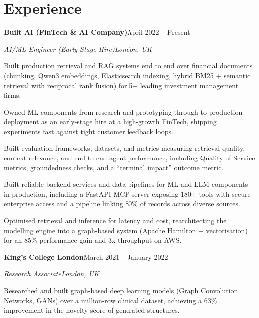 \documentclass[10pt,a4paper]{article}
\newcommand{\entry}[4]{%
  {\color{company}\bfseries #1}\hfill {\color{muted}#2}\par
  \vspace{1pt}
  {\itshape #3}\hfill {\color{muted}\itshape #4}\par
  \vspace{3pt}%
}
\begin{document}
\section{Experience}
\entry{Built AI (FinTech \& AI Company)}{April 2022 -- Present}{AI/ML Engineer (Early Stage Hire)}{London, UK}
\begin{tight}
  \item Built production retrieval and RAG systems end to end over financial documents (chunking, Qwen3 embeddings, Elasticsearch indexing, hybrid BM25 + semantic retrieval with reciprocal rank fusion) for 5+ leading investment management firms.
  \item Owned ML components from research and prototyping through to production deployment as an early-stage hire at a high-growth FinTech, shipping experiments fast against tight customer feedback loops.
  \item Built evaluation frameworks, datasets, and metrics measuring retrieval quality, context relevance, and end-to-end agent performance, including Quality-of-Service metrics, groundedness checks, and a ``terminal impact'' outcome metric.
  \item Built reliable backend services and data pipelines for ML and LLM components in production, including a FastAPI MCP server exposing 180+ tools with secure enterprise access and a pipeline linking 80\% of records across diverse sources.
  \item Optimised retrieval and inference for latency and cost, rearchitecting the modelling engine into a graph-based system (Apache Hamilton + vectorisation) for an 85\% performance gain and 3x throughput on AWS.
\end{tight}

\entry{King's College London}{March 2021 -- January 2022}{Research Associate}{London, UK}
\begin{tight}
  \item Researched and built graph-based deep learning models (Graph Convolution Networks, GANs) over a million-row clinical dataset, achieving a 63\% improvement in the novelty score of generated structures.
\end{tight}

\end{document}
